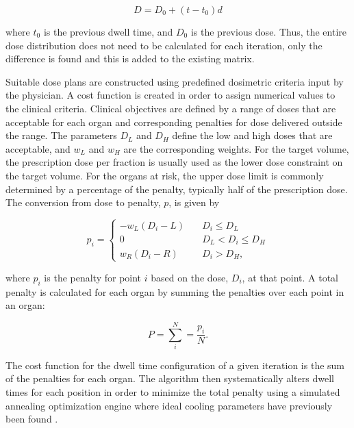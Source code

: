\documentclass[osajnl,twocolumn,showpacs,superscriptaddress,10pt]{revtex4-1}
\begin{document}
\begin{equation}\label{eq:dose}
    D = D_0 + (t - t_0)d
\end{equation}

where $t_0$ is the previous dwell time, and $D_0$ is the previous dose. Thus, the entire dose distribution does not need to be calculated for each iteration, only the difference is found and this is added to the existing matrix.

Suitable dose plans are constructed using predefined dosimetric criteria input by the physician. A cost function is created in order to assign numerical values to the clinical criteria. Clinical objectives are defined by a range of doses that are acceptable for each organ and corresponding penalties for dose delivered outside the range. The parameters $D_L$ and $D_H$ define the low and high doses that are acceptable, and $w_L$ and $w_H$ are the corresponding weights. For the target volume, the prescription dose per fraction is usually used as the lower dose constraint on the target volume. For the organs at risk, the upper dose limit is commonly determined by a percentage of the penalty, typically half of the prescription dose. The conversion from dose to penalty, $p$, is given by 

\begin{equation}\label{eq:cost}
    p_{i} = \left\{
        \begin{array}{ll}
            -w_L(D_i - L) & \quad D_i \leq D_L \\
            0 & \quad D_L < D_i \leq D_H \\
            w_R(D_i - R) & \quad D_i > D_H,
        \end{array}
    \right.
\end{equation}

where $p_i$ is the penalty for point $i$ based on the dose, $D_i$, at that point. A total penalty is calculated for each organ by summing the penalties over each point in an organ: 

\begin{equation}\label{eq:penalty}
    P = \sum_{i}^{N} = \frac{p_i}{N}.
\end{equation}

The cost function for the dwell time configuration of a given iteration is the sum of the penalties for each organ. The algorithm then systematically alters dwell times for each position in order to minimize the total penalty using a simulated annealing optimization engine where ideal cooling parameters have previously been found \cite{ipsa}. 
\end{document}

